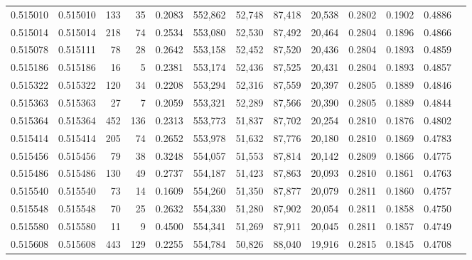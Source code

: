 \begin{tabular}{rrrrrrrrrrrrr}
0.515010 & 0.515010 &   133 &    35 &                                     0.2083 & 552,862 &  52,748 &  87,418 &  20,538 & 0.2802 & 0.1902 & 0.4886 \\
0.515014 & 0.515014 &   218 &    74 &                                     0.2534 & 553,080 &  52,530 &  87,492 &  20,464 & 0.2804 & 0.1896 & 0.4866 \\
0.515078 & 0.515111 &    78 &    28 &                                     0.2642 & 553,158 &  52,452 &  87,520 &  20,436 & 0.2804 & 0.1893 & 0.4859 \\
0.515186 & 0.515186 &    16 &     5 &                                     0.2381 & 553,174 &  52,436 &  87,525 &  20,431 & 0.2804 & 0.1893 & 0.4857 \\
0.515322 & 0.515322 &   120 &    34 &                                     0.2208 & 553,294 &  52,316 &  87,559 &  20,397 & 0.2805 & 0.1889 & 0.4846 \\
0.515363 & 0.515363 &    27 &     7 &                                     0.2059 & 553,321 &  52,289 &  87,566 &  20,390 & 0.2805 & 0.1889 & 0.4844 \\
0.515364 & 0.515364 &   452 &   136 &                                     0.2313 & 553,773 &  51,837 &  87,702 &  20,254 & 0.2810 & 0.1876 & 0.4802 \\
0.515414 & 0.515414 &   205 &    74 &                                     0.2652 & 553,978 &  51,632 &  87,776 &  20,180 & 0.2810 & 0.1869 & 0.4783 \\
0.515456 & 0.515456 &    79 &    38 &                                     0.3248 & 554,057 &  51,553 &  87,814 &  20,142 & 0.2809 & 0.1866 & 0.4775 \\
0.515486 & 0.515486 &   130 &    49 &                                     0.2737 & 554,187 &  51,423 &  87,863 &  20,093 & 0.2810 & 0.1861 & 0.4763 \\
0.515540 & 0.515540 &    73 &    14 &                                     0.1609 & 554,260 &  51,350 &  87,877 &  20,079 & 0.2811 & 0.1860 & 0.4757 \\
0.515548 & 0.515548 &    70 &    25 &                                     0.2632 & 554,330 &  51,280 &  87,902 &  20,054 & 0.2811 & 0.1858 & 0.4750 \\
0.515580 & 0.515580 &    11 &     9 &                                     0.4500 & 554,341 &  51,269 &  87,911 &  20,045 & 0.2811 & 0.1857 & 0.4749 \\
0.515608 & 0.515608 &   443 &   129 &                                     0.2255 & 554,784 &  50,826 &  88,040 &  19,916 & 0.2815 & 0.1845 & 0.4708 \\

\end{tabular}

